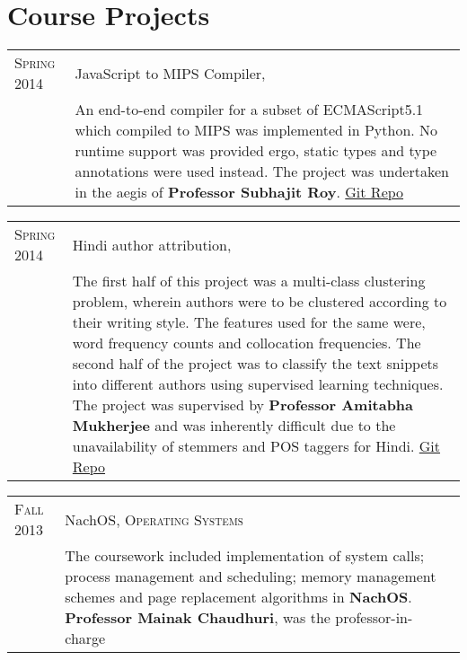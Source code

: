 \documentclass[a4paper,10pt]{article} %
\begin{document}
\section{Course Projects}

\begin{tabular}{p{2.2cm}|p{11cm}}
    \textsc{Spring 2014} & JavaScript to MIPS Compiler, \textsc{\raggedright Compilers} \\
                         & \footnotesize{An end-to-end compiler for a subset of ECMAScript5.1
                            which compiled to MIPS was implemented in Python. No runtime support
                            was provided ergo, static types and type annotations were used instead.
                            The project was undertaken in the aegis of \textbf{Professor Subhajit Roy}.
                            \href{https://github.com/srijanshetty/javascript-compiler} {Git Repo}} \\
\end{tabular}

\begin{tabular}{p{2.2cm}|p{11cm}}
    \textsc{Spring 2014} & Hindi author attribution, \textsc{\raggedright Artificial Intelligence} \\
                         & \footnotesize{The first half of this project was a multi-class clustering problem,
                            wherein authors were to be clustered according to their writing style.
                            The features used for the same were, word frequency counts and collocation
                            frequencies.  The second half of the project was to classify the text snippets
                            into different authors using supervised learning techniques.
                            The project was supervised by \textbf{Professor Amitabha Mukherjee} and was
                            inherently difficult due to the unavailability of stemmers and POS taggers for Hindi.
                            \href{https://github.com/srijanshetty/author-attribution} {Git Repo}}\\
\end{tabular}

\begin{tabular}{p{2.2cm}|p{11cm}}
    \textsc{Fall 2013} & NachOS, \textsc{Operating Systems} \\
                       & \footnotesize{The coursework included implementation of system calls; process
                          management and scheduling; memory management schemes and page replacement
                          algorithms in \textbf{NachOS}. \textbf{Professor Mainak Chaudhuri}, was
                          the professor-in-charge}\\
\end{tabular}
\end{document}
